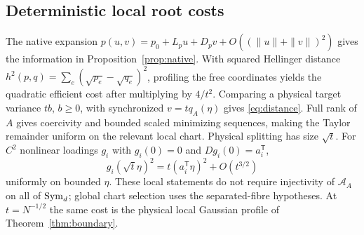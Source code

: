 \subsection{Deterministic local root costs}
The native expansion $p(u,v)=p_0+L_pu+D_pv+O((\|u\|+\|v\|)^2)$ gives the information in Proposition~\ref{prop:native}. With squared Hellinger distance $h^2(p,q)=\sum_e(\sqrt{p_e}-\sqrt{q_e})^2$, profiling the free coordinates yields the quadratic efficient cost after multiplying by $4/t^2$. Comparing a physical target variance $tb$, $b\ge0$, with synchronized $v=tq_A(\eta)$ gives \eqref{eq:distance}. Full rank of $A$ gives coercivity and bounded scaled minimizing sequences, making the Taylor remainder uniform on the relevant local chart. Physical splitting has size $\sqrt t$. For $C^2$ nonlinear loadings $g_i$ with $g_i(0)=0$ and $Dg_i(0)=a_i^{\mathsf T}$,
\[
 g_i(\sqrt t\eta)^2=t(a_i^{\mathsf T}\eta)^2+O(t^{3/2})
\]
uniformly on bounded $\eta$. These local statements do not require injectivity of $\mathcal A_A$ on all of $\operatorname{Sym}_d$; global chart selection uses the separated-fibre hypotheses. At $t=N^{-1/2}$ the same cost is the physical local Gaussian profile of Theorem~\ref{thm:boundary}.
